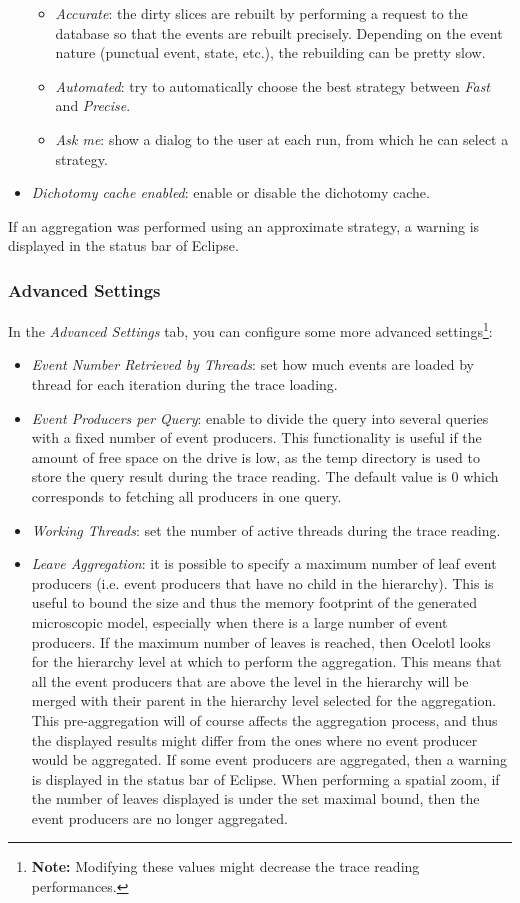 \documentclass[twoside]{article}
\begin{document}
\begin{sloppypar}
\begin{itemize}
\begin{itemize}
		\item \textit{Accurate}: the dirty slices are rebuilt by performing a request to the database so that the events are rebuilt precisely. Depending on the event nature (punctual event, state, etc.), the rebuilding can be pretty slow.
		\item \textit{Automated}: try to automatically choose the best strategy between \textit{Fast} and \textit{Precise}. 
		\item \textit{Ask me}: show a dialog to the user at each run, from which he can select a strategy.
	\end{itemize}   
	\item \textit{Dichotomy cache enabled}: enable or disable the dichotomy cache.
\end{itemize} 

If an aggregation was performed using an approximate strategy, a warning is displayed in the status bar of Eclipse.

\subsubsection{Advanced Settings}
In the \textit{Advanced Settings} tab, you can configure some more advanced settings\footnote{\textbf{Note:} Modifying these values might decrease the trace reading performances.}:
\begin{itemize}
	\item \textit{Event Number Retrieved by Threads}: set how much events are loaded by thread for each iteration during the trace loading.
	\item \textit{Event Producers per Query}: enable to divide the query into several queries with a fixed number of event producers. This functionality is useful if the amount of free space on the drive is low, as the temp directory is used to store the query result during the trace reading. The default value is 0 which corresponds to fetching all producers in one query.
	\item \textit{Working Threads}: set the number of active threads during the trace reading. 
	\item \textit{Leave Aggregation}: it is possible to specify a maximum number of leaf event producers (i.e. event producers that have no child in the hierarchy). This is useful to bound the size and thus the memory footprint of the generated microscopic model, especially when there is a large number of event producers. If the maximum number of leaves is reached, then Ocelotl looks for the hierarchy level at which to perform the aggregation. This means that all the event producers that are above the level in the hierarchy will be merged with their parent in the hierarchy level selected for the aggregation. This pre-aggregation will of course affects the aggregation process, and thus the displayed results might differ from the ones where no event producer would be aggregated. If some event producers are aggregated, then a warning is displayed in the status bar of Eclipse. When performing a spatial zoom, if the number of leaves displayed is under the set maximal bound, then the event producers are no longer aggregated.
\end{itemize}


\end{sloppypar}
\end{document}
